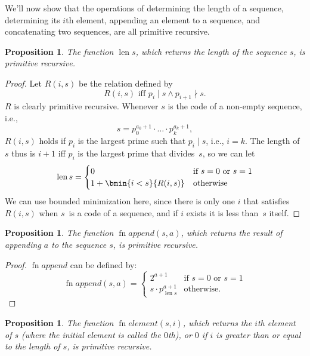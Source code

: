 \documentclass[10pt,a4paper]{article}
\theoremstyle{plain}
\newtheorem{prop}[thm]{Proposition}
\theoremstyle{definition}
\theoremstyle{remark}
\providecommand{\len}{\operatorname{len}}
\providecommand{\fn}{\operatorname{fn}}
\providecommand{\fn}{\operatorname{fn}}
\begin{document}
We'll now show that the operations of determining the length of a
sequence, determining its $i$th element, appending an element to a
sequence, and concatenating two sequences, are all primitive
recursive.

\begin{prop}
  The function $\len{s}$, which returns the length of the sequence
  $s$, is primitive recursive.
\end{prop}

\begin{proof}
  Let $R(i, s)$ be the relation defined by
  \[
  R(i, s) \text{ iff }
  p_i \mid s \land p_{i+1} \nmid s.
  \]
  $R$ is clearly primitive recursive. Whenever $s$ is the code of a
  non-empty sequence, i.e.,
  \[
  s = p_0^{a_0+1} \cdot \dots \cdot p_{k}^{a_{k}+1},
  \]
  $R(i,s)$ holds if $p_i$ is the largest prime such that
  $p_i \mid s$, i.e., $i = k$. The length of $s$ thus is $i+1$ iff
  $p_i$ is the largest prime that divides~$s$, so we can let
  \[
  \len{s} =
  \begin{cases}
    0 & \text{if $s = 0$ or $s = 1$} \\
    1 + \bmin{i < s}{R(i, s)} & \text{otherwise}
  \end{cases}
  \]
  We can use bounded minimization here, since there is only one $i$ that
  satisfies $R(i,s)$ when $s$~is a code of a sequence, and if $i$
  exists it is less than~$s$ itself.
\end{proof}

\begin{prop}
  The function $\fn{append}(s,a)$, which returns the result of appending $a$ to
  the sequence $s$, is primitive recursive.
\end{prop}

\begin{proof}
  $\fn{append}$ can be defined by:
  \[
  \fn{append}(s,a) =
  \begin{cases}
    2^{a+1} & \text{if $s = 0$ or $s = 1$} \\
    s \cdot p_{\len{s}}^{a+1} & \text{otherwise.}
  \end{cases}
  \]
\end{proof}

\begin{prop}
  The function $\fn{element}(s,i)$, which returns the $i$th element of $s$
  (where the initial element is called the $0$th), or $0$ if $i$ is
  greater than or equal to the length of $s$, is primitive recursive.
\end{prop}
\end{document}
